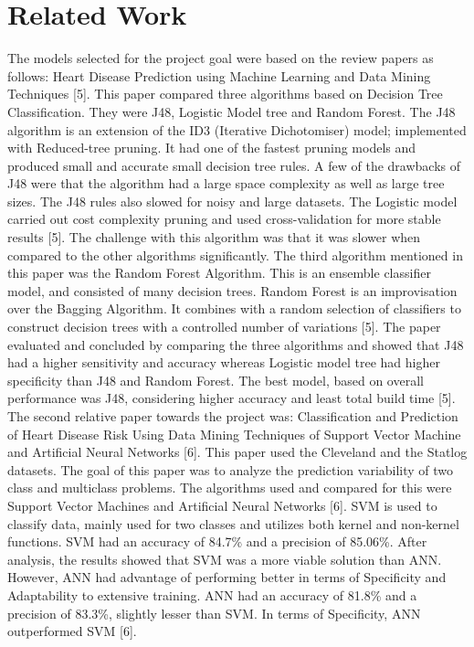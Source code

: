 \documentclass[conference]{IEEEtran}
\begin{document}
\section{Related Work}
The models selected for the project goal were based on the review papers as follows: Heart Disease Prediction using Machine Learning and Data Mining Techniques [5]. This paper compared three algorithms based on Decision Tree Classification. They were J48, Logistic Model tree and Random Forest. The J48 algorithm is an extension of the ID3 (Iterative Dichotomiser) model; implemented with Reduced-tree pruning. It had one of the fastest pruning models and produced small and accurate small decision tree rules. A few of the drawbacks of J48 were that the algorithm had a large space complexity as well as large tree sizes. The J48 rules also slowed for noisy and large datasets. The Logistic model carried out cost complexity pruning and used cross-validation for more stable results [5]. The challenge with this algorithm was that it was slower when compared to the other algorithms significantly. The third algorithm mentioned in this paper was the Random Forest Algorithm. This is an ensemble classifier model, and consisted of many decision trees. Random Forest is an improvisation over the Bagging Algorithm. It combines with a random selection of classifiers to construct decision trees with a controlled number of variations [5]. The paper evaluated and concluded by comparing the three algorithms and showed that J48 had a higher sensitivity and accuracy whereas Logistic model tree had higher specificity than J48 and Random Forest. The best model, based on overall performance was J48, considering higher accuracy and least total build time [5].\\

The second relative paper towards the project was: Classification and Prediction of Heart Disease Risk Using Data Mining Techniques of Support Vector Machine and Artificial Neural Networks [6]. This paper used the Cleveland and the Statlog datasets. The goal of this paper was to analyze the prediction variability of two class and multiclass problems. The algorithms used and compared for this were Support Vector Machines and Artificial Neural Networks [6]. SVM is used to classify data, mainly used for two classes and utilizes both kernel and non-kernel functions. SVM had an accuracy of 84.7\% and a precision of 85.06\%. After analysis, the results showed that SVM was a more viable solution than ANN. However, ANN had advantage of performing better in terms of Specificity and Adaptability to extensive training. ANN had an accuracy of 81.8\% and a precision of 83.3\%, slightly lesser than SVM. In terms of Specificity, ANN outperformed SVM [6].\\
\end{document}
